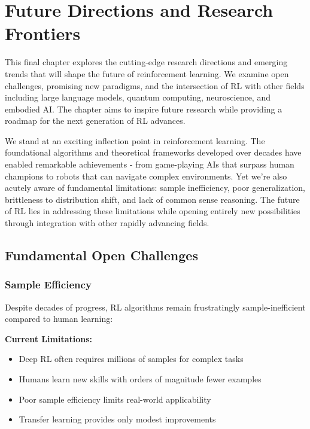 \chapter{Future Directions and Research Frontiers}
\label{ch:future-directions}

\begin{keyideabox}
This final chapter explores the cutting-edge research directions and emerging trends that will shape the future of reinforcement learning. We examine open challenges, promising new paradigms, and the intersection of RL with other fields including large language models, quantum computing, neuroscience, and embodied AI. The chapter aims to inspire future research while providing a roadmap for the next generation of RL advances.
\end{keyideabox}

\begin{intuitionbox}
We stand at an exciting inflection point in reinforcement learning. The foundational algorithms and theoretical frameworks developed over decades have enabled remarkable achievements - from game-playing AIs that surpass human champions to robots that can navigate complex environments. Yet we're also acutely aware of fundamental limitations: sample inefficiency, poor generalization, brittleness to distribution shift, and lack of common sense reasoning. The future of RL lies in addressing these limitations while opening entirely new possibilities through integration with other rapidly advancing fields.
\end{intuitionbox}

\section{Fundamental Open Challenges}

\subsection{Sample Efficiency}

Despite decades of progress, RL algorithms remain frustratingly sample-inefficient compared to human learning:

\textbf{Current Limitations:}
\begin{itemize}
    \item Deep RL often requires millions of samples for complex tasks
    \item Humans learn new skills with orders of magnitude fewer examples
    \item Poor sample efficiency limits real-world applicability
    \item Transfer learning provides only modest improvements
\end{itemize}

